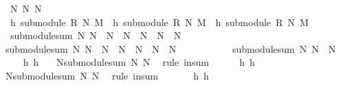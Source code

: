 \begin{isabellebody}
\ \ \ N\ N{}\ N{}\isanewline
\ \ \ h{}{\isacharcolon}\ {\isachardoublequoteopen}submodule\ R\ N{}\ M{\isachardoublequoteclose}\ \ h{}{\isacharcolon}\ {\isachardoublequoteopen}submodule\ R\ N{}\ M{\isachardoublequoteclose}\ \ h{}{\isacharcolon}\ {\isachardoublequoteopen}submodule\ R\ N\ M{\isachardoublequoteclose}\isanewline
\ \ \ {\isachardoublequoteopen}{\isacharparenleft}submodule{\isacharunderscore}sum\ N{}\ N{}{\isacharparenright}\ {\isasymsubseteq}\ N\ {\isasymlongleftrightarrow}\ N{}\ {\isasymsubseteq}\ N\ {\isasymand}\ N{}\ {\isasymsubseteq}\ N{\isachardoublequoteclose}\isanewline
%
\isadelimproof
%
\endisadelimproof
%
\isatagproof
{}\isamarkupfalse%
\ {\isacharminus}\ \isanewline
\ \ \isamarkupfalse%
\ {}{\isacharcolon}\ {\isachardoublequoteopen}{\isacharparenleft}submodule{\isacharunderscore}sum\ N{}\ N{}{\isacharparenright}\ {\isasymsubseteq}\ N\ {\isasymLongrightarrow}\ N{}\ {\isasymsubseteq}\ N\ {\isasymand}\ N{}\ {\isasymsubseteq}\ N{\isachardoublequoteclose}\isanewline
\ \ \isamarkupfalse%
\ {\isacharminus}\isanewline
\ \ \ \ \isamarkupfalse%
\ {}{}{\isacharcolon}\ {\isachardoublequoteopen}{\isacharparenleft}submodule{\isacharunderscore}sum\ N{}\ N{}{\isacharparenright}\ {\isasymsubseteq}\ N{\isachardoublequoteclose}\isanewline
\ \ \ \ \isamarkupfalse%
\ h{}\ h{}\ \isamarkupfalse%
\ {}{}{\isacharcolon}\ {\isachardoublequoteopen}N{}{\isasymsubseteq}submodule{\isacharunderscore}sum\ N{}\ N{}{\isachardoublequoteclose}\ \isamarkupfalse%
\ {\isacharparenleft}rule\ in{\isacharunderscore}sum{\isacharparenright}\isanewline
\ \ \ \ \isamarkupfalse%
\ h{}\ h{}\ \isamarkupfalse%
\ {}{}{\isacharcolon}\ {\isachardoublequoteopen}N{}{\isasymsubseteq}submodule{\isacharunderscore}sum\ N{}\ N{}{\isachardoublequoteclose}\ \isamarkupfalse%
\ {\isacharparenleft}rule\ in{\isacharunderscore}sum{\isacharparenright}\isanewline
\ \ \ \ \isamarkupfalse%
\ {}{}\ h{}\ h{}\ \isamarkupfalse%

\end{isabellebody}
